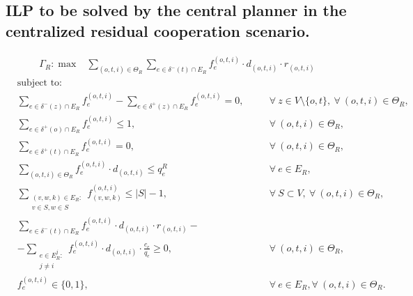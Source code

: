 \documentclass[review]{elsarticle}
\begin{document}
\subsection{ILP to be solved by the central planner in the centralized residual cooperation scenario.}

  \begin{align}
        &  \Gamma_R: \max  & \sum_{(o,t,i) \in \Theta_R} \sum_{e \in \delta^-(t)\cap E_R}  f_e^{(o,t,i)} \cdot d_{(o,t,i)} \cdot r_{(o,t,i)} &&   
    \end{align}
    \begin{align}
        & \text{subject to:}       && \nonumber\\
        & \sum_{e \in \delta^-(z)\cap E_R} f_e^{(o,t,i)}-\sum_{e \in \delta^+(z)\cap E_R} f_{e}^{(o,t,i)}  = 0,           \quad && \forall\ z\in V\setminus\{o,t\},\ \forall\ (o,t,i)\in\Theta_R, \\[1em]
& \sum_{e \in \delta^+(o)\cap E_R} f_e^{(o,t,i)}\leq 1, && \forall\ (o,t,i)\in \Theta_R,  \\
& \sum_{e \in \delta^+(t)\cap E_R} f_e^{(o,t,i)}  = 0, && \forall\ (o,t,i)\in \Theta_R,  \\
 & \sum_{(o,t,i) \in \Theta_R} f_e^{(o,t,i)}\cdot d_{(o,t,i)} \leq q_e^R   &&\forall\ e \in E_R,   \\
& \sum_{\substack{(v,w,k)\in E_R\colon\\v\in S,w \in S }} f_{(v,w,k)}^{(o,t,i)} \leq |S| -1,  && \forall\ S \subset V, \ \forall\ (o,t,i) \in \Theta_R, \\
& \sum_{e \in \delta^-(t)\cap E_R}  f_e^{(o,t,i)}  \cdot d_{(o,t,i)} \cdot r_{(o,t,i)} - && \nonumber\\
& -\sum_{\substack{e \in E_R^j\colon \\ j\not = i}} f_e^{(o,t,i)} \cdot d_{(o,t,i)} \cdot \frac{c_e}{q_e}\geq 0, && \forall\ (o,t,i) \in \Theta_R, \\
& f_e^{(o,t,i)} \in \{0,1\},    && \forall\ e \in E_R, \forall\ (o,t,i) \in \Theta_R.
    \end{align}
\end{document}
